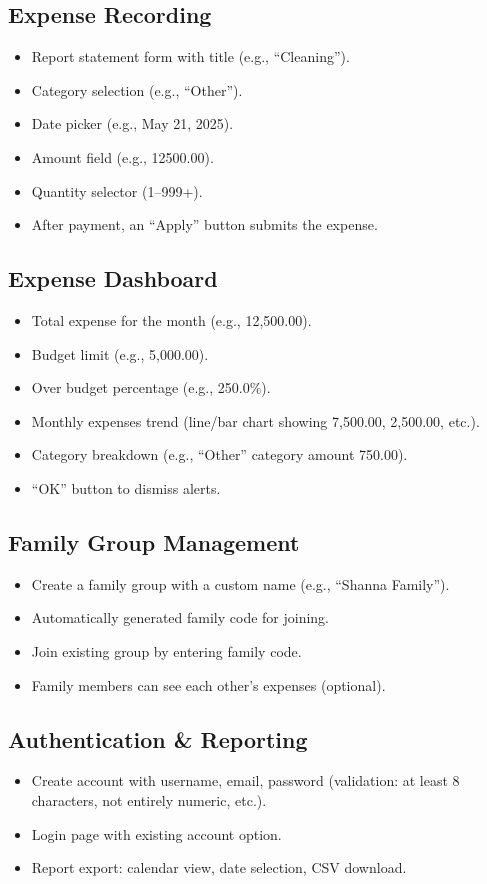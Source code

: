 \documentclass[12pt,a4paper]{article}
\begin{document}
\subsection{Expense Recording}
\begin{itemize}
    \item Report statement form with title (e.g., “Cleaning”).
    \item Category selection (e.g., “Other”).
    \item Date picker (e.g., May 21, 2025).
    \item Amount field (e.g., 12500.00).
    \item Quantity selector (1–999+).
    \item After payment, an “Apply” button submits the expense.
\end{itemize}

\subsection{Expense Dashboard}
\begin{itemize}
    \item Total expense for the month (e.g., 12,500.00).
    \item Budget limit (e.g., 5,000.00).
    \item Over budget percentage (e.g., 250.0\%).
    \item Monthly expenses trend (line/bar chart showing 7,500.00, 2,500.00, etc.).
    \item Category breakdown (e.g., “Other” category amount 750.00).
    \item “OK” button to dismiss alerts.
\end{itemize}

\subsection{Family Group Management}
\begin{itemize}
    \item Create a family group with a custom name (e.g., “Shanna Family”).
    \item Automatically generated family code for joining.
    \item Join existing group by entering family code.
    \item Family members can see each other’s expenses (optional).
\end{itemize}

\subsection{Authentication \& Reporting}
\begin{itemize}
    \item Create account with username, email, password (validation: at least 8 characters, not entirely numeric, etc.).
    \item Login page with existing account option.
    \item Report export: calendar view, date selection, CSV download.
\end{itemize}
\end{document}
